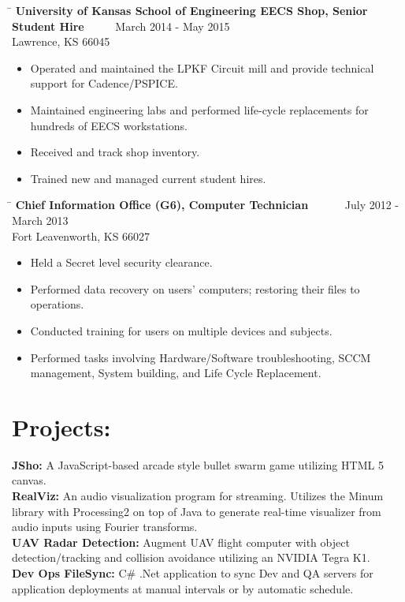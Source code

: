 \documentclass{res}
\begin{document}
\begin{resume}
\begin{itemize}
	\end{itemize}
   \begin{tabbing}
   \hspace{5.5in}\= \kill
   {\bf University of Kansas School of Engineering EECS Shop, Senior Student Hire}  \>~~~~~March 2014 - May 2015\\
   Lawrence, KS 66045
   \end{tabbing}\vspace{-10pt}
	\begin{itemize}
		\item Operated and maintained the LPKF Circuit mill and provide technical support for Cadence/PSPICE.
		\item Maintained engineering labs and performed life-cycle replacements for hundreds of EECS workstations.
		\item Received and track shop inventory.
		\item Trained new and managed current student hires.\vspace{-15pt}
	\end{itemize}
   \begin{tabbing}
	\hspace{5.5in}\= \kill
	{\bf Chief Information Office (G6), Computer Technician}  \>~~~~~~July 2012 - March 2013\\
	Fort Leavenworth, KS 66027
\end{tabbing}\vspace{-10pt}
	\begin{itemize}
		\item Held a Secret level security clearance.
		\item Performed data recovery on users' computers; restoring their files to operations.
		\item Conducted training for users on multiple devices and subjects.
		\item Performed tasks involving Hardware/Software troubleshooting, SCCM management, System building, and Life Cycle Replacement.\vspace{-10pt}
	\end{itemize}

\section{Projects:}          
{\textbf{JSho:} A JavaScript-based arcade style bullet swarm game utilizing HTML 5 canvas.\\\textbf{RealViz:} An audio visualization program for streaming. Utilizes the Minum library with Processing2 on top of Java to generate real-time visualizer from audio inputs using Fourier transforms.\\\textbf{UAV Radar Detection:} Augment UAV flight computer with object detection/tracking and collision avoidance utilizing an NVIDIA Tegra K1.\\\textbf{Dev Ops FileSync:} C\# .Net application to sync Dev and QA servers for application deployments at manual intervals or by automatic schedule.}
 
\end{resume}
\end{document}
